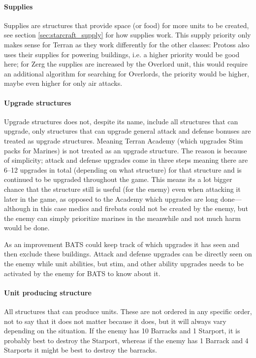\paragraph{Supplies \attackCoordinatorWeightsSupplyStructure}
Supplies are structures that provide space (or food) for more units to be created, see section
\ref{sec:starcraft_supply} for how supplies work. This supply priority only makes sense for Terran
as they work differently for the other classes: Protoss also uses their supplies for powering
buildings, i.e. a higher priority would be good here; for Zerg the supplies are increased by the
Overlord unit, this would require an additional algorithm for searching for Overlords, the priority
would be higher, maybe even higher for only air attacks.

\paragraph{Upgrade structures \attackCoordinatorWeightsUpgradeStructure}
Upgrade structures does not, despite its name, include all structures that can upgrade, only
structures that can upgrade general attack and defense bonuses are treated as upgrade structures.
Meaning Terran Academy (which upgrades Stim packs for Marines) is not treated as an upgrade
structure. The reason is because of simplicity; attack and defense upgrades come in three steps
meaning there are 6–12 upgrades in total (depending on what structure) for that structure and is
continued to be upgraded throughout the game. This means its a lot bigger chance that the structure
still is useful (for the enemy) even when attacking it later in the game, as opposed to the Academy
which upgrades are long done—although in this case medics and firebats could not be created by the
enemy, but the enemy can simply prioritize marines in the meanwhile and not much harm would be done.

As an improvement BATS could keep track of which upgrades it has seen and then exclude these
buildings. Attack and defense upgrades can be directly seen on the enemy while unit abilities, but
stim, and other ability upgrades needs to be activated by the enemy for BATS to know about it.

\paragraph{Unit producing structure \attackCoordinatorWeightsUnitProducingStructure}
All structures that can produce units. These are not ordered in any specific order, not to say that
it does not matter because it does, but it will always vary depending on the situation. If the enemy
has 10 Barracks and 1 Starport, it is probably best to destroy the Starport, whereas if the enemy
has 1 Barrack and 4 Starports it might be best to destroy the barracks.

